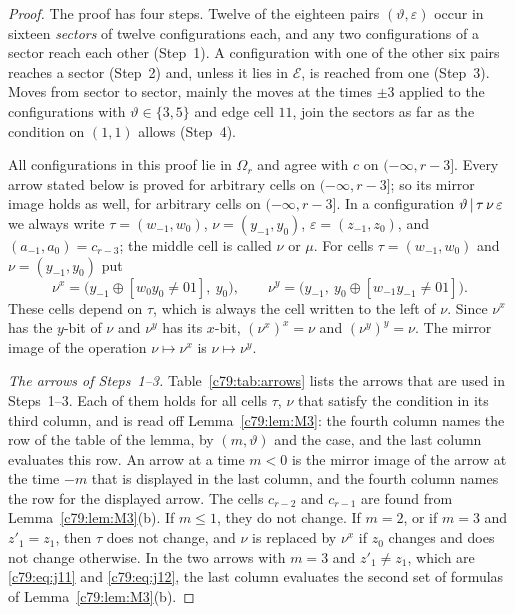 \begin{proof}
The proof has four steps. Twelve of the eighteen pairs $(\vartheta,\varepsilon)$ occur in sixteen \emph{sectors} of twelve configurations each, and any two configurations of a sector reach each other (Step~1). A configuration with one of the other six pairs reaches a sector (Step~2) and, unless it lies in $\mathcal E$, is reached from one (Step~3). Moves from sector to sector, mainly the moves at the times $\pm3$ applied to the configurations with $\vartheta\in\{3,5\}$ and edge cell $11$, join the sectors as far as the condition on $(1,1)$ allows (Step~4).

All configurations in this proof lie in $\Omega_r$ and agree with $c$ on $(-\infty,r-3]$. Every arrow stated below is proved for arbitrary cells on $(-\infty,r-3]$; so its mirror image holds as well, for arbitrary cells on $(-\infty,r-3]$. In a configuration $\vartheta\,|\,\tau\,\nu\,\varepsilon$ we always write $\tau=(w_{-1},w_0)$, $\nu=(y_{-1},y_0)$, $\varepsilon=(z_{-1},z_0)$, and $(a_{-1},a_0)=c_{r-3}$; the middle cell is called $\nu$ or $\mu$. For cells $\tau=(w_{-1},w_0)$ and $\nu=(y_{-1},y_0)$ put
\[
\nu^x=\bigl(y_{-1}\oplus[w_0y_0\ne01],\ y_0\bigr),\qquad \nu^y=\bigl(y_{-1},\ y_0\oplus[w_{-1}y_{-1}\ne01]\bigr).
\]
These cells depend on $\tau$, which is always the cell written to the left of $\nu$. Since $\nu^x$ has the $y$-bit of $\nu$ and $\nu^y$ has its $x$-bit, $(\nu^x)^x=\nu$ and $(\nu^y)^y=\nu$. The mirror image of the operation $\nu\mapsto\nu^x$ is $\nu\mapsto\nu^y$.

\emph{The arrows of Steps~1--3.} Table~\ref{c79:tab:arrows} lists the arrows that are used in Steps~1--3. Each of them holds for all cells $\tau$, $\nu$ that satisfy the condition in its third column, and is read off Lemma~\ref{c79:lem:M3}: the fourth column names the row of the table of the lemma, by $(m,\vartheta)$ and the case, and the last column evaluates this row. An arrow at a time $m<0$ is the mirror image of the arrow at the time $-m$ that is displayed in the last column, and the fourth column names the row for the displayed arrow. The cells $c_{r-2}$ and $c_{r-1}$ are found from Lemma~\ref{c79:lem:M3}(b). If $m\le1$, they do not change. If $m=2$, or if $m=3$ and $z'_1=z_1$, then $\tau$ does not change, and $\nu$ is replaced by $\nu^x$ if $z_0$ changes and does not change otherwise. In the two arrows with $m=3$ and $z'_1\ne z_1$, which are \eqref{c79:eq:j11} and \eqref{c79:eq:j12}, the last column evaluates the second set of formulas of Lemma~\ref{c79:lem:M3}(b).


\end{proof}
